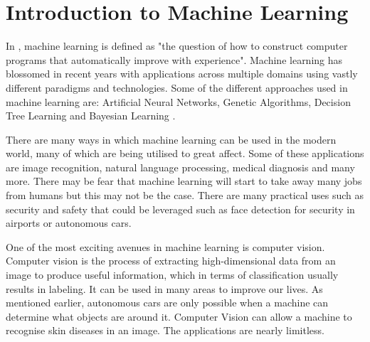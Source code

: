 \section{Introduction to Machine Learning}
In \textcite{MLANN}, machine learning is defined as "the question of how to
construct computer programs that automatically improve with experience".
Machine learning has blossomed in recent years with applications across multiple
domains using vastly different paradigms and technologies. 
Some of the different approaches used in machine learning are: Artificial Neural Networks, Genetic Algorithms, Decision Tree Learning and Bayesian Learning \textcite{MLANN}.

There are many ways in which machine learning can be used in the modern world,
many of which are being utilised to great affect.
Some of these applications are image recognition, natural language
processing,
medical diagnosis and many more.
There may be fear that machine learning will start to take away many jobs
from
humans but this may not be the case. There are many practical uses such as security and safety that could be leveraged such as face detection for security in airports or autonomous cars.

One of the most exciting avenues in machine learning is
computer
vision. Computer vision is the process of extracting high-dimensional data from an image to produce useful information, which in terms of classification usually results in labeling. It can be used in many areas to improve our lives. As
mentioned earlier, autonomous cars are only possible when a machine can
determine what objects are around it. Computer Vision can allow a machine to
recognise skin diseases in an image. The applications are nearly limitless.

